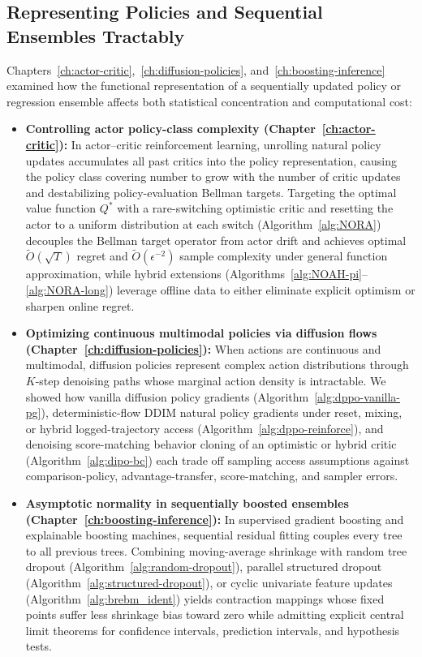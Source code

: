 \begin{aigenblock}
\subsection{Representing Policies and Sequential Ensembles Tractably}

Chapters~\ref{ch:actor-critic},~\ref{ch:diffusion-policies}, and~\ref{ch:boosting-inference} examined how the functional representation of a sequentially updated policy or regression ensemble affects both statistical concentration and computational cost:
\begin{itemize}
\item \textbf{Controlling actor policy-class complexity (Chapter~\ref{ch:actor-critic}):} In actor--critic reinforcement learning, unrolling natural policy updates accumulates all past critics into the policy representation, causing the policy class covering number to grow with the number of critic updates and destabilizing policy-evaluation Bellman targets. Targeting the optimal value function $Q^*$ with a rare-switching optimistic critic and resetting the actor to a uniform distribution at each switch (Algorithm~\ref{alg:NORA}) decouples the Bellman target operator from actor drift and achieves optimal $\widetilde{O}(\sqrt{T})$ regret and $\widetilde{O}(\epsilon^{-2})$ sample complexity under general function approximation, while hybrid extensions (Algorithms~\ref{alg:NOAH-pi}--\ref{alg:NORA-long}) leverage offline data to either eliminate explicit optimism or sharpen online regret.
\item \textbf{Optimizing continuous multimodal policies via diffusion flows (Chapter~\ref{ch:diffusion-policies}):} When actions are continuous and multimodal, diffusion policies represent complex action distributions through $K$-step denoising paths whose marginal action density is intractable. We showed how vanilla diffusion policy gradients (Algorithm~\ref{alg:dppo-vanilla-pg}), deterministic-flow DDIM natural policy gradients under reset, mixing, or hybrid logged-trajectory access (Algorithm~\ref{alg:dppo-reinforce}), and denoising score-matching behavior cloning of an optimistic or hybrid critic (Algorithm~\ref{alg:dipo-bc}) each trade off sampling access assumptions against comparison-policy, advantage-transfer, score-matching, and sampler errors.
\item \textbf{Asymptotic normality in sequentially boosted ensembles (Chapter~\ref{ch:boosting-inference}):} In supervised gradient boosting and explainable boosting machines, sequential residual fitting couples every tree to all previous trees. Combining moving-average shrinkage with random tree dropout (Algorithm~\ref{alg:random-dropout}), parallel structured dropout (Algorithm~\ref{alg:structured-dropout}), or cyclic univariate feature updates (Algorithm~\ref{alg:brebm_ident}) yields contraction mappings whose fixed points suffer less shrinkage bias toward zero while admitting explicit central limit theorems for confidence intervals, prediction intervals, and hypothesis tests.
\end{itemize}


\end{aigenblock}
